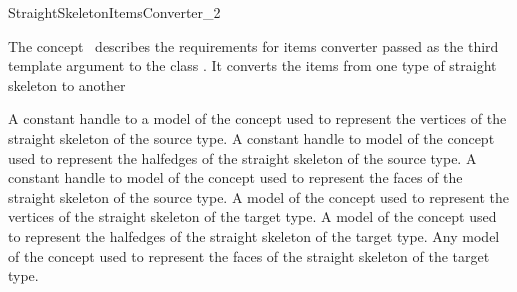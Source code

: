 
\begin{ccRefConcept}{StraightSkeletonItemsConverter_2}


\ccDefinition

The concept \ccRefName\ describes the requirements for items converter passed as the third template argument to the class . It converts the  items from one type of straight skeleton to another

\ccTypes
  {A constant handle to a model of the  concept 
  used to represent the vertices of the straight skeleton of the source type.}{}
  \ccGlue
   {A constant handle to model of the  concept 
    used to represent the halfedges of the straight skeleton of the source type.}{}
  \ccGlue
  {A constant handle to model of the  concept 
   used to represent the faces of the straight skeleton of the source type.}{}
  \ccGlue
  {A model of the  concept used to represent the vertices 
  of the straight skeleton of the target type.}{}
  \ccGlue
  {A model of the  concept used to represent the halfedges
   of the straight skeleton of the target type.}{}
  \ccGlue
  {Any model of the  concept used to represent the faces 
   of the straight skeleton of the target type.}{}

\ccOperations


\end{ccRefConcept}
